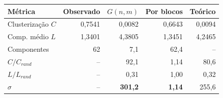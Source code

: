 \begin{tabular}{lrrrr}
  \toprule
  Métrica & Observado & $G(n,m)$ & Por blocos & Teórico \\
  \midrule
  Clusterização $C$ & 0,7541 & 0,0082 & 0,6643 & 0,0094 \\
  Comp. médio $L$ & 1,3401 & 4,3805 & 1,3451 & 4,2465 \\
  Componentes & 62 & 7,1 & 62,4 & -- \\
  $C/C_{rand}$ & -- & 92,1 & 1,14 & 80,6 \\
  $L/L_{rand}$ & -- & 0,31 & 1,00 & 0,32 \\
  $\sigma$ & -- & \textbf{301,2} & \textbf{1,14} & 255,6 \\
  \bottomrule
\end{tabular}
